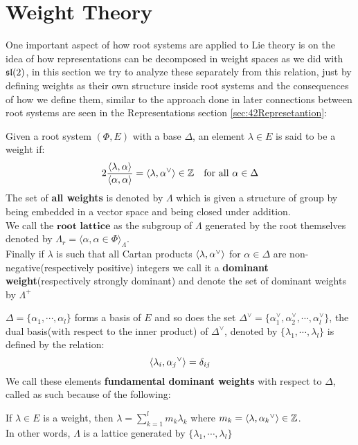 \section{Weight Theory}
One important aspect of how root systems are applied to Lie theory is on the idea of how representations can be decomposed in weight spaces as we did with $\mathfrak{sl}(2)$, in this section we try to analyze these separately from this  relation, just by defining weights as their own structure inside root systems and the consequences of how we define them, similar to the approach done in \cite{humphreys1} later connections between root systems are seen in the Representations section \ref{sec:42Represetantion}:\\
\begin{defi}
	Given a root system $(\Phi,E)$ with a base $\Delta$, an element $\lambda \in E$ is said to be a weight if:
	$$ 2\frac{\langle \lambda , \alpha \rangle}{\langle \alpha,\alpha\rangle } = \langle {\lambda},{\alpha}^\lor\rangle \in \mathbb{Z} \ \ \ \text{for all } \alpha \in \Delta$$
	The set of \textbf{all weights} is denoted by $\Lambda$ which is given a structure of group by being embedded in a vector space and being closed under addition. \\
	We call the $\textbf{root lattice}$ as the subgroup of $\Lambda$ generated by the root themselves denoted by $\Lambda_r = \langle \alpha, \alpha \in \Phi \rangle_\Lambda$.\\
	Finally if $\lambda$ is such that all Cartan products $\langle {\lambda},{\alpha}^\lor\rangle$ for $\alpha \in \Delta$ are non-negative(respectively positive) integers we call it a \textbf{dominant weight}(respectively strongly dominant) and denote the set of dominant weights by $\Lambda^+$
\end{defi}
$\Delta = \{\alpha_1,\cdots,\alpha_l\}$ forms a basis of $E$ and so does the set $\Delta^\lor = \{\alpha_1^\lor, \alpha_2^\lor , \cdots, \alpha_l^\lor \}$, the dual basis(with respect to the inner product) of $\Delta^\lor$, denoted by $\{\lambda_1,\cdots,\lambda_l\}$ is defined by the relation:
$$ \langle {\lambda_i},{\alpha_j}^\lor\rangle = \delta_{ij}$$
We call these elements \textbf{fundamental dominant weights} with respect to $\Delta$, called as such because of the following:
\begin{prop}
If $\lambda \in E$ is a weight, then $\lambda = \displaystyle\sum_{k=1}^l m_k\lambda_k$ where $m_k = \langle {\lambda},{\alpha_k}^\lor\rangle\in \mathbb{Z}$. \\ 
In other words, $\Lambda$ is a lattice generated by $\{\lambda_1,\cdots,\lambda_l\}$
\end{prop}

